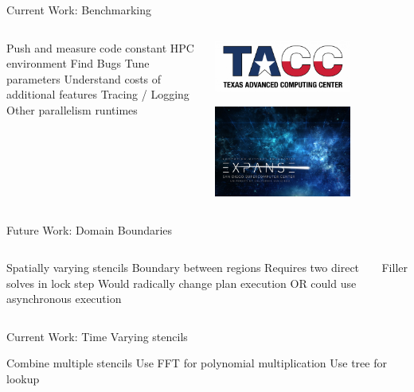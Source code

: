 \begin{frame}{Current Work: Benchmarking}
  \begin{columns}
  \begin{outline}
    \1 Push and measure code constant HPC environment
    \1 Find Bugs
    \1 Tune parameters
    \1 Understand costs of additional features
    \2 Tracing / Logging
    \2 Other parallelism runtimes
  \end{outline}

  \begin{center}
  \centering

  \includegraphics[width=0.7\textwidth]{tacc_logo.png}

  \vspace{1cm}

  \includegraphics[width=0.7\textwidth]{expanse_logo.png}

  \end{center}
  \end{columns}
\end{frame}

\begin{frame}{Future Work: Domain Boundaries}
  \begin{columns}
  \begin{outline}
    \1 Spatially varying stencils 
    \1 Boundary between regions
    \1 Requires two direct solves in lock step
    \1 Would radically change plan execution
    \1 OR could use asynchronous execution
  \end{outline}

  \begin{center}
  \centering
  Filler
  \end{center}
  \end{columns}
\end{frame}

\begin{frame}{Current Work: Time Varying stencils}
  \begin{outline}
    \1 Combine multiple stencils
    \1 Use FFT for polynomial multiplication
    \1 Use tree for lookup
  \end{outline}

  
\end{frame}

